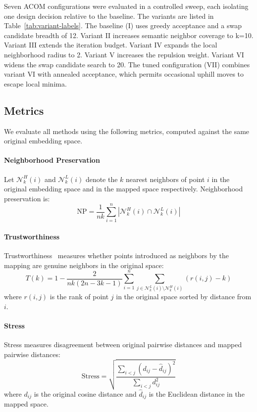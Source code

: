 Seven ACOM configurations were evaluated in a controlled sweep, each isolating one design decision relative to the baseline. The variants are listed in Table~\ref{tab:variant-labels}. The baseline (I) uses greedy acceptance and a swap candidate breadth of 12. Variant II increases semantic neighbor coverage to k=10. Variant III extends the iteration budget. Variant IV expands the local neighborhood radius to 2. Variant V increases the repulsion weight. Variant VI widens the swap candidate search to 20. The tuned configuration (VII) combines variant VI with annealed acceptance, which permits occasional uphill moves to escape local minima.

\subsection{Metrics}

We evaluate all methods using the following metrics, computed against the same original embedding space.

\paragraph{Neighborhood Preservation}
Let $\mathcal{N}_k^H(i)$ and $\mathcal{N}_k^L(i)$ denote the $k$ nearest neighbors of point $i$ in the original embedding space and in the mapped space respectively. Neighborhood preservation is:
\begin{equation}
\text{NP} = \frac{1}{nk} \sum_{i=1}^{n} \left|\mathcal{N}_k^H(i) \cap \mathcal{N}_k^L(i)\right|
\end{equation}

\paragraph{Trustworthiness}
Trustworthiness~\cite{venna2006trustworthiness} measures whether points introduced as neighbors by the mapping are genuine neighbors in the original space:
\begin{equation}
T(k) = 1 - \frac{2}{nk(2n-3k-1)} \sum_{i=1}^{n} \sum_{j \in \mathcal{N}_k^L(i) \setminus \mathcal{N}_k^H(i)} (r(i,j) - k)
\end{equation}
where $r(i,j)$ is the rank of point $j$ in the original space sorted by distance from $i$.

\paragraph{Stress}
Stress measures disagreement between original pairwise distances and mapped pairwise distances:
\begin{equation}
\text{Stress} = \sqrt{\frac{\sum_{i<j}(d_{ij} - \hat{d}_{ij})^2}{\sum_{i<j} d_{ij}^2}}
\end{equation}
where $d_{ij}$ is the original cosine distance and $\hat{d}_{ij}$ is the Euclidean distance in the mapped space.

